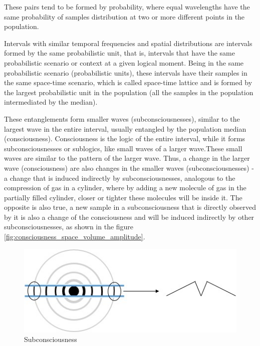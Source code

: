 These pairs tend to be formed by probability, where equal wavelengths have the same probability of samples distribution at two or more different points in the population. 

Intervals with similar temporal frequencies and spatial distributions are intervals formed by the same probabilistic unit, that is, intervals that have the same probabilistic scenario or context at a given logical moment. Being in the same probabilistic scenario (probabilistic units), these intervals have their samples in the same space-time scenario, which is called space-time lattice and is formed by the largest probabilistic unit in the population (all the samples in the population intermediated by the median). 

These entanglements form smaller waves (subconsciousnesses), similar to the largest wave in the entire interval, usually entangled by the population median (consciousness). Consciousness is the logic of the entire interval, while it forms subconsciousnesses or sublogics, like small waves of a larger wave.These small waves are similar to the pattern of the larger wave.  Thus, a change in the larger wave (consciousness) are also changes in the smaller waves (subconsciousnesses) - a change that is induced indirectly by subconsciousnesses, analogous to the compression of gas in a cylinder, where by adding a new molecule of gas in the partially filled cylinder, closer or tighter these molecules will be inside it.  The opposite is also true, a new sample in a subconsciousness that is directly observed by it is also a change of the consciousness and will be induced indirectly by other subconsciousnesses, as shown in the figure \ref{fig:consciousness_space_volume_amplitude}.
	\begin{figure}[H]
	\caption{Subconsciousness}
	\label{fig:consciousness_subconscious}
	\centering
	\includegraphics[scale=.8]{sections/images/consciousness_subconscious.jpg}
	\end{figure}
	
